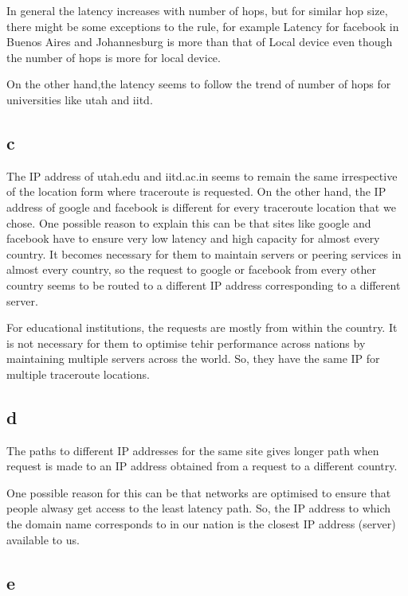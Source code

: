 \documentclass{article}
\begin{document}
In general the latency increases with number of hops, but for similar hop size, there might be some exceptions to the rule, for example 
Latency for facebook in Buenos Aires and Johannesburg is more than that of Local device even though the number of hops is more for local device.

On the other hand,the latency seems to follow the trend of number of hops for universities like utah and iitd.

\subsection*{c}

The IP address of utah.edu and iitd.ac.in seems to remain the same irrespective of the location form where traceroute is requested.
On the other hand, the IP address of google and facebook is different for every traceroute location that we chose.
One possible reason to explain this can be that sites like google and facebook have to ensure very low latency and high capacity for
almost every country. It becomes necessary for them to maintain servers or peering services in almost every country, so the request to 
google or facebook from every other country seems to be routed to a different IP address corresponding to a different server.

For educational institutions, the requests are mostly from within the country. It is not necessary for them to optimise tehir 
performance across nations by maintaining multiple servers across the world. So, they have the same IP for multiple traceroute
locations.

\subsection*{d}

The paths to different IP addresses for the same site gives longer path when request is made to an IP address obtained from a request 
to a different country. 

One possible reason for this can be that networks are optimised to ensure that people alwasy get access to the least latency path. So,
the IP address to which the domain name corresponds to in our nation is the closest IP address (server) available to us.

\subsection*{e}
\end{document}
